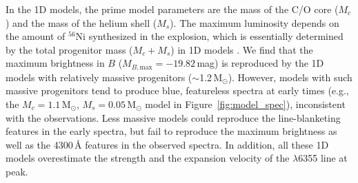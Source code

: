 \documentclass[twocolumn]{aastex631}
\begin{document}
\begin{CJK*}{UTF8}{gbsn}
In the 1D models, the prime model parameters are the mass of the C/O core ($M_c$) and the mass of the helium shell ($M_s$). The maximum luminosity depends on the amount of $^{56}$Ni synthesized in the explosion, which is essentially determined by the total progenitor mass ($M_c+M_s$) in 1D models \citep{polin_observational_2019}. We find that the maximum brightness in $B$ ($M_{B,\mathrm{max}}=-19.82$\,mag) is reproduced by the 1D models with relatively massive progenitors ($\sim$1.2\,$\mathrm{M_\odot}$). However, models with such massive progenitors tend to produce blue, featureless spectra at early times (e.g., the $M_c=1.1\,\mathrm{M_\odot}$, $M_s=0.05\,\mathrm{M_\odot}$ model in Figure~\ref{fig:model_spec}), inconsistent with the observations. Less massive models could reproduce the line-blanketing features in the early spectra, but fail to reproduce the maximum brightness as well as the 4300\,\r{A} features in the observed spectra. In addition, all these 1D models overestimate the strength and the expansion velocity of the  $\lambda$6355 line at peak.


\end{CJK*}
\end{document}

